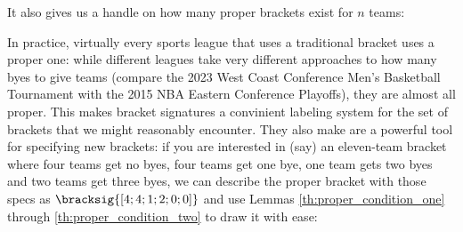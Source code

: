 {It also gives us a handle on how many proper brackets exist for $n$ teams:


In practice, virtually every sports league that uses a traditional bracket uses a proper one: while different leagues take very different approaches to how many byes to give teams (compare the 2023 West Coast Conference Men's Basketball Tournament with the 2015 NBA Eastern Conference Playoffs), they are almost all proper. This makes bracket signatures a convinient labeling system for the set of brackets that we might reasonably encounter. They also make are a powerful tool for specifying new brackets: if you are interested in (say) an eleven-team bracket where four teams get no byes, four teams get one bye, one team gets two byes and two teams get three byes, we can describe the proper bracket with those specs as $\bracksig{[4; 4; 1; 2; 0; 0]}$ and use Lemmas \ref{th:proper_condition_one} through \ref{th:proper_condition_two} to draw it with ease:

}